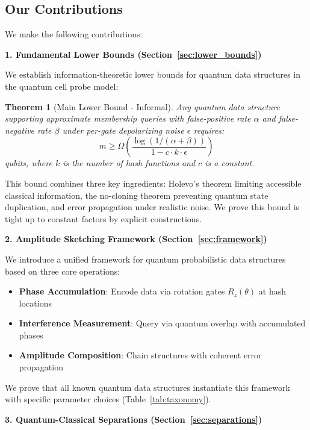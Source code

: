 \documentclass[11pt,letterpaper]{article}
\newtheorem{theorem}{Theorem}
\begin{document}
\subsection{Our Contributions}

We make the following contributions:

\textbf{1. Fundamental Lower Bounds (Section~\ref{sec:lower_bounds})}

We establish information-theoretic lower bounds for quantum data structures in the quantum cell probe model:

\begin{theorem}[Main Lower Bound - Informal]
\label{thm:main_lower_bound_informal}
Any quantum data structure supporting approximate membership queries with false-positive rate $\alpha$ and false-negative rate $\beta$ under per-gate depolarizing noise $\epsilon$ requires:
\begin{equation}
m \geq \Omega\left(\frac{\log(1/(\alpha + \beta))}{1 - c \cdot k \cdot \epsilon}\right)
\end{equation}
qubits, where $k$ is the number of hash functions and $c$ is a constant.
\end{theorem}

This bound combines three key ingredients: Holevo's theorem limiting accessible classical information, the no-cloning theorem preventing quantum state duplication, and error propagation under realistic noise. We prove this bound is tight up to constant factors by explicit constructions.

\textbf{2. Amplitude Sketching Framework (Section~\ref{sec:framework})}

We introduce a unified framework for quantum probabilistic data structures based on three core operations:
\begin{itemize}
\item \textbf{Phase Accumulation}: Encode data via rotation gates $R_z(\theta)$ at hash locations
\item \textbf{Interference Measurement}: Query via quantum overlap with accumulated phases
\item \textbf{Amplitude Composition}: Chain structures with coherent error propagation
\end{itemize}

We prove that all known quantum data structures instantiate this framework with specific parameter choices (Table~\ref{tab:taxonomy}).

\textbf{3. Quantum-Classical Separations (Section~\ref{sec:separations})}
\end{document}

